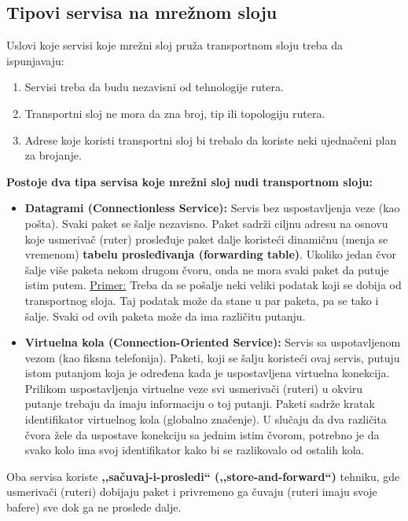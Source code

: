 \documentclass[a4paper]{article}
\begin{document}
    \subsection{Tipovi servisa na mrežnom sloju}
        Uslovi koje servisi koje mrežni sloj pruža transportnom sloju treba da ispunjavaju:
        \begin{enumerate}
            \item Servisi treba da budu nezavisni od tehnologije rutera.
            \item Transportni sloj ne mora da zna broj, tip ili topologiju rutera.
            \item Adrese koje koristi transportni sloj bi trebalo da koriste
                  neki ujednačeni plan za brojanje.
        \end{enumerate}
        \textbf{Postoje dva tipa servisa koje mrežni sloj nudi transportnom sloju:}
        \begin{itemize}
            \item \textbf{Datagrami (Connectionless Service):} Servis bez uspostavljenja 
                  veze (kao pošta). Svaki paket se šalje nezavisno. Paket sadrži ciljnu adresu
                  na osnovu koje usmerivač (ruter) prosleđuje paket dalje koristeći dinamičnu
                  (menja se vremenom) \textbf{tabelu prosleđivanja (forwarding table)}. Ukoliko
                  jedan čvor šalje više paketa nekom drugom čvoru, onda ne mora svaki paket
                  da putuje istim putem. \underline{Primer:} Treba da se pošalje neki veliki podatak koji
                  se dobija od transportnog sloja. Taj podatak može da stane u par paketa, pa
                  se tako i šalje. Svaki od ovih paketa može da ima različitu putanju.
            \item \textbf{Virtuelna kola (Connection-Oriented Service):} Servis sa uspotavljenom
                  vezom (kao fiksna telefonija). Paketi, koji se šalju koristeći ovaj servis,
                  putuju istom putanjom koja je određena kada je uspostavljena virtuelna konekcija.
                  Prilikom uspostavljenja virtuelne veze svi usmerivači (ruteri) u okviru
                  putanje trebaju da imaju informaciju o toj putanji. Paketi sadrže kratak identifikator
                  virtuelnog kola (globalno značenje). U slučaju da dva različita čvora žele
                  da uspostave konekciju sa jednim istim čvorom, potrebno je da svako kolo
                  ima svoj identifikator kako bi se razlikovalo od ostalih kola.  
        \end{itemize}
        Oba servisa koriste \textbf{,,sačuvaj-i-prosledi`` (,,store-and-forward``)} tehniku, gde
        usmerivači (ruteri) dobijaju paket i privremeno ga čuvaju (ruteri imaju svoje bafere)
        sve dok ga ne proslede dalje.
\end{document}
